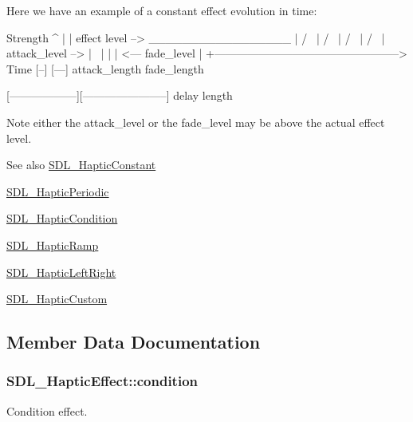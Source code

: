 Here we have an example of a constant effect evolution in time\+: \begin{DoxyVerb}Strength
^
|
|    effect level -->  _________________
|                     /                 \
|                    /                   \
|                   /                     \
|                  /                       \
| attack_level --> |                        \
|                  |                        |  <---  fade_level
|
+--------------------------------------------------> Time
                   [--]                 [---]
                   attack_length        fade_length

[------------------][-----------------------]
delay               length
\end{DoxyVerb}


Note either the attack\+\_\+level or the fade\+\_\+level may be above the actual effect level.

\begin{DoxySeeAlso}{See also}
\hyperlink{structSDL__HapticConstant}{S\+D\+L\+\_\+\+Haptic\+Constant} 

\hyperlink{structSDL__HapticPeriodic}{S\+D\+L\+\_\+\+Haptic\+Periodic} 

\hyperlink{structSDL__HapticCondition}{S\+D\+L\+\_\+\+Haptic\+Condition} 

\hyperlink{structSDL__HapticRamp}{S\+D\+L\+\_\+\+Haptic\+Ramp} 

\hyperlink{structSDL__HapticLeftRight}{S\+D\+L\+\_\+\+Haptic\+Left\+Right} 

\hyperlink{structSDL__HapticCustom}{S\+D\+L\+\_\+\+Haptic\+Custom} 
\end{DoxySeeAlso}


\subsection{Member Data Documentation}
\hypertarget{unionSDL__HapticEffect_aa8fdd1ba202ccd7e61f48ef9977080d2}{}
\subsubsection[{condition}]{ S\+D\+L\+\_\+\+Haptic\+Effect\+::condition}\label{unionSDL__HapticEffect_aa8fdd1ba202ccd7e61f48ef9977080d2}
Condition effect. \hypertarget{unionSDL__HapticEffect_ac435275e9683d6cc5d65b9c7cc2ec659}{}
